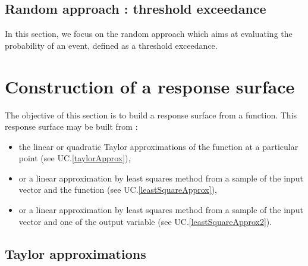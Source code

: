 \newpage \subsection{Random approach : threshold exceedance}

In this section, we focus on the random approach which aims at evaluating the probability of an event, defined as a threshold exceedance.


\newpage 
\newpage 
\newpage 
\newpage 
\newpage 
\newpage 
\newpage 
\newpage 
\newpage 



\newpage \section{Construction of a response surface}



The objective of this section  is to build a response surface from a function. This response surface may be built from :
\begin{itemize}
\item the linear or quadratic Taylor approximations of the function at a particular point (see UC.\ref{taylorApprox}),
\item or a linear approximation by least squares method from a sample of the input vector and the function (see UC.\ref{leastSquareApprox}),
\item or a linear approximation by least squares method from a sample of the input vector and one of the output variable (see UC.\ref{leastSquareApprox2}).
\end{itemize}



\subsection{Taylor approximations}

